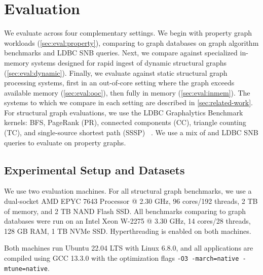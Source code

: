 \chapter{Evaluation}
\label{sec:evaluation}

We evaluate \project{} across four complementary settings.
We begin with property graph workloads (\autoref{sec:eval:property}), comparing \project{} to graph databases on graph algorithm benchmarks and LDBC SNB queries.
Next, we compare against specialized in-memory systems designed for rapid ingest of dynamic structural graphs (\autoref{sec:eval:dynamic}).
Finally, we evaluate against static structural graph processing systems, first in an out-of-core setting where the graph exceeds available memory (\autoref{sec:eval:ooc}), then fully in memory (\autoref{sec:eval:inmem}).
The systems to which we compare in each setting are described in \autoref{sec:related-work}.
For structural graph evaluations, we use the LDBC Graphalytics Benchmark kernels: BFS, PageRank (PR), connected components (CC), triangle counting (TC), and single-source shortest path (SSSP) ~\cite{LDBCGrapalytics22:online}.
We use a mix of  and LDBC SNB queries to evaluate \project{} on property graphs.

\section{Experimental Setup and Datasets}
\label{sec:eval:setup}

We use two evaluation machines.
For all structural graph benchmarks, we use a dual-socket AMD EPYC 7643 Processor @ 2.30 GHz, 96 cores/192 threads, 2 TB of memory, and 2 TB NAND Flash SSD.
All benchmarks comparing \project{} to graph databases were run on an Intel Xeon W-2275 @ 3.30 GHz, 14 cores/28 threads, 128 GB RAM, 1 TB NVMe SSD.
Hyperthreading is enabled on both machines.

Both machines run Ubuntu 22.04 LTS with Linux 6.8.0, and all applications are compiled using GCC 13.3.0 with the optimization flags \texttt{-O3 -march=native -mtune=native}.

